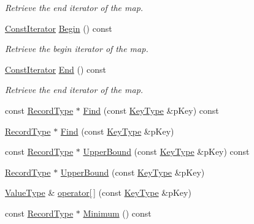 \begin{DoxyCompactItemize}
\begin{DoxyCompactList}\small\item\em Retrieve the end iterator of the map. \end{DoxyCompactList}\item 
\hyperlink{class_fbx_map_acf89f4bb5cf415e5e04087c2179bf367}{Const\+Iterator} \hyperlink{class_fbx_map_af6956e55ea4b46656a9a357935d74b96}{Begin} () const
\begin{DoxyCompactList}\small\item\em Retrieve the begin iterator of the map. \end{DoxyCompactList}\item 
\hyperlink{class_fbx_map_acf89f4bb5cf415e5e04087c2179bf367}{Const\+Iterator} \hyperlink{class_fbx_map_a76fc48a3c9243bcd747e6725a1e148b5}{End} () const
\begin{DoxyCompactList}\small\item\em Retrieve the end iterator of the map. \end{DoxyCompactList}\item 
const \hyperlink{class_fbx_map_af8fc887461b3bf29f41aa36d15ddb54f}{Record\+Type} $\ast$ \hyperlink{class_fbx_map_a39d841b85599678c497c960e060d3772}{Find} (const \hyperlink{class_fbx_map_ad8392c83b6f8eeb9e0706bcc8674270a}{Key\+Type} \&p\+Key) const
\item 
\hyperlink{class_fbx_map_af8fc887461b3bf29f41aa36d15ddb54f}{Record\+Type} $\ast$ \hyperlink{class_fbx_map_a3ed10339972bfa73f5123a871c1f7e5d}{Find} (const \hyperlink{class_fbx_map_ad8392c83b6f8eeb9e0706bcc8674270a}{Key\+Type} \&p\+Key)
\item 
const \hyperlink{class_fbx_map_af8fc887461b3bf29f41aa36d15ddb54f}{Record\+Type} $\ast$ \hyperlink{class_fbx_map_a4ad230da7739de9f136a07d7565411ab}{Upper\+Bound} (const \hyperlink{class_fbx_map_ad8392c83b6f8eeb9e0706bcc8674270a}{Key\+Type} \&p\+Key) const
\item 
\hyperlink{class_fbx_map_af8fc887461b3bf29f41aa36d15ddb54f}{Record\+Type} $\ast$ \hyperlink{class_fbx_map_aaaa41638bc860b13b3abc232d1db08e7}{Upper\+Bound} (const \hyperlink{class_fbx_map_ad8392c83b6f8eeb9e0706bcc8674270a}{Key\+Type} \&p\+Key)
\item 
\hyperlink{class_fbx_map_abea530b1192b31c3cf05fbf247e3dcaa}{Value\+Type} \& \hyperlink{class_fbx_map_a2c0f757eed20687c6b8fd3339c0f35ce}{operator\mbox{[}$\,$\mbox{]}} (const \hyperlink{class_fbx_map_ad8392c83b6f8eeb9e0706bcc8674270a}{Key\+Type} \&p\+Key)
\item 
const \hyperlink{class_fbx_map_af8fc887461b3bf29f41aa36d15ddb54f}{Record\+Type} $\ast$ \hyperlink{class_fbx_map_a12efe88fe10227cf0aca2284a3474193}{Minimum} () const

\end{DoxyCompactItemize}
